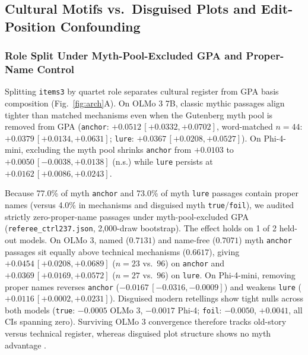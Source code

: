 \documentclass[conference]{IEEEtran}
\begin{document}
\subsection{Cultural Motifs vs.\ Disguised Plots and Edit-Position Confounding}
\label{sec:motifs}
\subsubsection{Role Split Under Myth-Pool-Excluded GPA and Proper-Name Control}
Splitting \texttt{items3} by quartet role separates cultural register from GPA basis composition (Fig.~\ref{fig:arch}A). On OLMo 3 7B, classic mythic passages align tighter than matched mechanisms even when the Gutenberg myth pool is removed from GPA (\texttt{anchor}: $+0.0512\,[+0.0332,+0.0702]$, word-matched $n=44$: $+0.0379\,[+0.0134,+0.0631]$; \texttt{lure}: $+0.0367\,[+0.0208,+0.0527]$). On Phi-4-mini, excluding the myth pool shrinks \texttt{anchor} from $+0.0103$ to $+0.0050\,[-0.0038,+0.0138]$ (n.s.) while \texttt{lure} persists at $+0.0162\,[+0.0086,+0.0243]$.

Because 77.0\% of myth \texttt{anchor} and 73.0\% of myth \texttt{lure} passages contain proper names (versus 4.0\% in mechanisms and disguised myth \texttt{true}/\texttt{foil}), we audited strictly zero-proper-name passages under myth-pool-excluded GPA (\texttt{referee\_ctrl237.json}, 2,000-draw bootstrap). The effect holds on 1 of 2 held-out models. On OLMo 3, named ($0.7131$) and name-free ($0.7071$) myth \texttt{anchor} passages sit equally above technical mechanisms ($0.6617$), giving $+0.0454\,[+0.0208,+0.0689]$ ($n=23$ vs.\ $96$) on \texttt{anchor} and $+0.0369\,[+0.0169,+0.0572]$ ($n=27$ vs.\ $96$) on \texttt{lure}. On Phi-4-mini, removing proper names reverses \texttt{anchor} ($-0.0167\,[-0.0316,-0.0009]$) and weakens \texttt{lure} ($+0.0116\,[+0.0002,+0.0231]$). Disguised modern retellings show tight nulls across both models (\texttt{true}: $-0.0005$ OLMo 3, $-0.0017$ Phi-4; \texttt{foil}: $-0.0050$, $+0.0041$, all CIs spanning zero). Surviving OLMo 3 convergence therefore tracks old-story versus technical register, whereas disguised plot structure shows no myth advantage \cite{roesler2012archetypes}.
\end{document}
